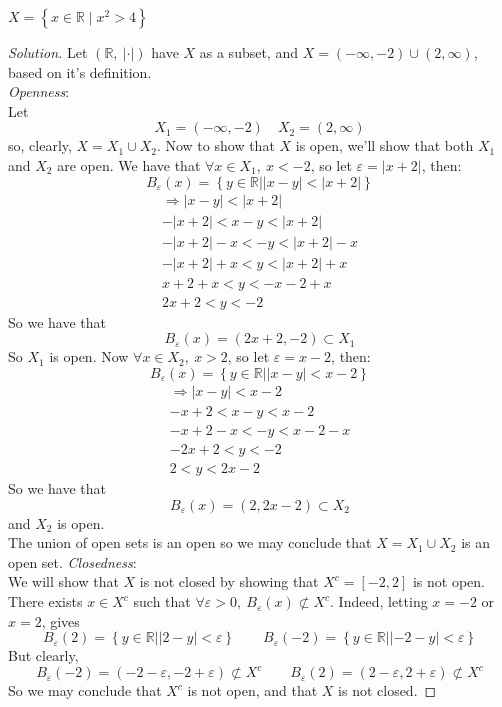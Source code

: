 \documentclass{article}
\newcommand{\abs}[1]{\left|#1\right|}
\newcommand{\parens}[1]{\left(#1\right)}
\newcommand{\bracks}[1]{\left\{#1\right\}}
\newcommand{\sqbracks}[1]{\left[#1\right]}
\newcommand{\vep}{\varepsilon}
\newcommand{\R}{\mathbb{R}}
\begin{document}
		\item $X = \bracks{x \in \R \mid x^2 > 4}$
		\begin{proof}[Solution]
		Let $\parens{\R,\ \abs{\cdot}}$ have $X$ as a subset, and $X = \parens{-\infty,-2}\cup\parens{2,\infty}$, based on it's definition.\\
		\textit{Openness}:\\
		Let 
		$$X_1 = \parens{-\infty,-2} \quad X_2 = \parens{2,\infty}$$
		so, clearly, $X = X_1\cup X_2$. Now to show that $X$ is open, we'll show that both $X_1$ and $X_2$ are open. We have that $\forall x \in X_1,\ x < -2$, so let $\vep = \abs{x+2}$, then:
		$$B_\vep(x) = \bracks{y\in \R \Big| \abs{x-y} < \abs{x+2}}$$
		\begin{align*}
		\Rightarrow \abs{x-y} < \abs{x+2} \\
		-\abs{x+2} < x-y < \abs{x+2} \\
		-\abs{x+2} - x < -y < \abs{x+2} -x \\
		-\abs{x+2} + x < y < \abs{x+2} + x \\
		x+2+x < y < -x-2 + x \\
		2x+2 < y < -2 
		\end{align*}
		So we have that 
		$$B_\vep(x) = (2x+2, -2) \subset X_1$$
		So $X_1$ is open. Now $\forall x \in X_2,\ x > 2$, so let $\vep = x-2$, then:
		$$B_\vep(x) = \bracks{y\in \R \Big| \abs{x-y} < x-2}$$
		\begin{align*}
		\Rightarrow \abs{x-y} < x-2 \\
		-x+2 < x-y < x-2 \\
		-x+2 - x < -y < x-2 -x \\
		-2x+2 < y < -2 \\
		2 < y < 2x-2 
		\end{align*}
		So we have that 
		$$B_\vep(x) = (2, 2x-2) \subset X_2$$
		and $X_2$ is open.\\
		The union of open sets is an open so we may conclude that $X = X_1 \cup X_2$ is an open set.
		\textit{Closedness}:\\
		We will show that $X$ is not closed by showing that $X^c = \sqbracks{-2,2}$ is not open. There exists $x \in X^c$ such that $\forall \vep >0,\ B_\vep (x) \not\subset X^c$. Indeed, letting $x = -2$ or $x = 2$, gives 
		$$B_\vep(2) = \bracks{y \in \R \Big| \abs{2 - y}< \vep} \qquad B_\vep(-2) = \bracks{y \in \R \Big| \abs{-2 - y}< \vep}$$
		But clearly,
		$$B_\vep(-2) = \parens{-2-\vep,-2+\vep} \not\subset X^c \qquad B_\vep(2) = \parens{2-\vep,2+\vep} \not\subset X^c$$
		So we may conclude that $X^c$ is not open, and that $X$ is not closed.
			
	
		\end{proof}
		
\end{document}
